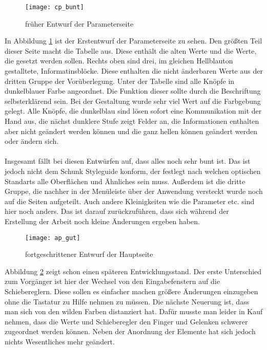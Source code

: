 \documentclass[11pt]{scrartcl}
\begin{document}
\begin{onehalfspace}
 
\begin{figure}[H]
\texttt{[image: cp\_bunt]}
\caption{früher Entwurf der Parameterseite}
\label{fig:cp_bunt}
\end{figure}
\vspace{1cm}

In Abbildung \ref{fig:cp_bunt} ist der Erstentwurf der Parameterseite zu sehen.
Den größten Teil dieser Seite macht die Tabelle aus. Diese enthält die alten Werte und die Werte, die gesetzt werden sollen. Rechts oben sind drei, im gleichen Hellblauton gestalltete, Informatinsblöcke. Diese enthalten die nicht änderbaren Werte aus der dritten Gruppe der Vorüberlegung. Unter der Tabelle sind alle Knöpfe in dunkelblauer Farbe angeordnet. Die Funktion dieser sollte durch die Beschriftung selbsterklärend sein. Bei der Gestaltung wurde sehr viel Wert auf die Farbgebung gelegt. Alle Knöpfe, die dunkelblau sind lösen sofort eine Kommunikation mit der Hand aus, die nächst dunklere Stufe zeigt Felder an, die Informationen enthalten aber nicht geändert werden können und die ganz hellen können geändert werden oder ändern sich.\\\\

Insgesamt fällt bei diesen Entwürfen auf, dass alles noch sehr bunt ist. Das ist jedoch nicht dem Schunk Styleguide konform, der festlegt nach welchen optischen Standarts alle Oberflächen und Ähnliches sein muss. Außerdem ist die dritte Gruppe, die nachher in der Menüleiste über der Anwendung versteckt wurde noch auf die Seiten aufgeteilt. Auch andere Kleinigkeiten wie die Parameter etc. sind hier noch anders. Das ist darauf zurückzuführen, dass sich während der Erstellung der Arbeit noch kleine Änderungen ergeben haben.  

\begin{figure}[H]
\texttt{[image: ap\_gut]}
\caption{fortgeschrittener Entwurf der Hauptseite}
\label{fig:ap_gut}
\end{figure}
\vspace{1cm}

Abbildung \ref{fig:ap_gut} zeigt schon einen späteren Entwicklungsstand. Der erste Unterschied zum Vorgänger ist hier der Wechsel von den Eingabefenstern auf die Schiebereglern. Diese sollen es einfacher machen größere Änderungen einzugeben ohne die Tastatur zu Hilfe nehmen zu müssen. Die nächste Neuerung ist, dass man sich von den wilden Farben distanziert hat. Dafür musste man leider in Kauf nehmen, dass die Werte und Schieberegler den Finger und Gelenken schwerer zugeordnet werden können. Neben der Anordnung der Elemente hat sich jedoch nichts Wesentliches mehr geändert.


\end{onehalfspace}
\end{document}
